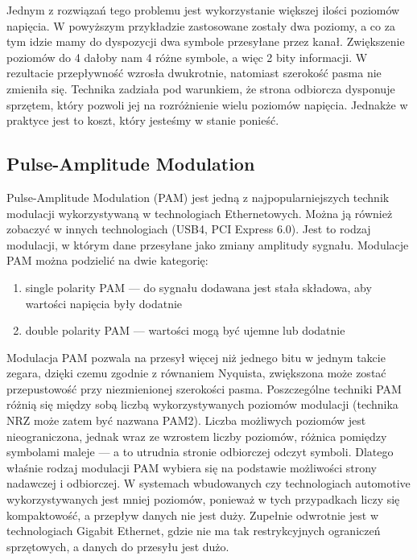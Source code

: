 Jednym z rozwiązań tego problemu jest wykorzystanie większej ilości poziomów napięcia. W powyższym przykładzie zastosowane zostały dwa poziomy, a co za tym idzie mamy do dyspozycji dwa symbole przesyłane przez kanał.
Zwiększenie poziomów do 4 dałoby nam 4 różne symbole, a więc 2 bity informacji. W rezultacie przepływność wzrosła dwukrotnie, natomiast szerokość pasma nie zmieniła się. Technika zadziała pod warunkiem, że strona odbiorcza dysponuje sprzętem, który pozwoli jej na
rozróżnienie wielu poziomów napięcia. Jednakże w praktyce jest to koszt, który jesteśmy w stanie ponieść.

\subsection{Pulse-Amplitude Modulation}

Pulse-Amplitude Modulation (PAM) jest jedną z najpopularniejszych technik modulacji wykorzystywaną w technologiach Ethernetowych. Można ją również zobaczyć w innych technologiach (USB4, PCI Express 6.0). Jest to rodzaj modulacji, w którym dane przesyłane jako zmiany amplitudy sygnału. Modulacje PAM można podzielić na dwie kategorię:

\begin{enumerate}
    \item single polarity PAM --- do sygnału dodawana jest stała składowa, aby wartości napięcia były dodatnie
    \item double polarity PAM --- wartości mogą być ujemne lub dodatnie
\end{enumerate}

Modulacja PAM pozwala na przesył więcej niż jednego bitu w jednym takcie zegara, dzięki czemu zgodnie z równaniem Nyquista, zwiększona może zostać przepustowość przy niezmienionej szerokości pasma.
Poszczególne techniki PAM różnią się między sobą liczbą wykorzystywanych poziomów modulacji (technika NRZ może zatem być nazwana PAM2).
Liczba możliwych poziomów jest nieograniczona, jednak wraz ze wzrostem liczby poziomów, różnica pomiędzy symbolami maleje --- a to utrudnia stronie odbiorczej odczyt symboli. Dlatego właśnie rodzaj modulacji PAM wybiera się na podstawie możliwości strony nadawczej i odbiorczej. W systemach wbudowanych czy technologiach automotive wykorzystywanych jest mniej poziomów,
ponieważ w tych przypadkach liczy się kompaktowość, a przepływ danych nie jest duży. Zupełnie odwrotnie jest w technologiach Gigabit Ethernet, gdzie nie ma tak restrykcyjnych ograniczeń sprzętowych, a danych do przesyłu jest dużo.

